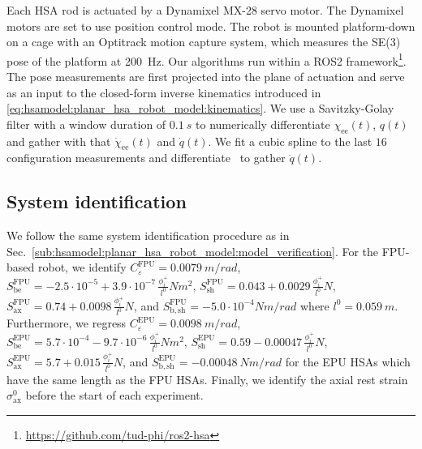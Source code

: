 Each \gls{HSA} rod is actuated by a Dynamixel MX-28 servo motor. The Dynamixel motors are set to use position control mode. %
The robot is mounted platform-down on a cage with an Optitrack motion capture system, which measures the SE(3) pose of the platform at \SI{200}{Hz}.
Our algorithms run within a ROS2 framework\footnote{\url{https://github.com/tud-phi/ros2-hsa}}. %
The pose measurements are first projected into the plane of actuation and serve as an input to the closed-form inverse kinematics introduced in \eqref{eq:hsamodel:planar_hsa_robot_model:kinematics}. 
We use a Savitzky-Golay filter with a window duration of $\SI{0.1}{s}$ to numerically differentiate $\chi_\mathrm{ee}(t)$, $q(t)$ and gather with that $\dot{\chi}_\mathrm{ee}(t)$ and $\dot{q}(t)$.
We fit a cubic spline to the last $16$ configuration measurements and differentiate~\citep{kaptanoglu2022pysindy} to gather $\dot{q}(t)$.


\subsection{System identification}
We follow the same system identification procedure as in Sec.~\ref{sub:hsamodel:planar_hsa_robot_model:model_verification}.
For the FPU-based robot, we identify $C_\varepsilon^\mathrm{FPU}=\SI{0.0079}{m \per rad}$, $S_\mathrm{be}^\mathrm{FPU} = -2.5 \cdot 10^{-5} + 3.9 \cdot 10^{-7} \, \frac{\phi_i^+}{l^0} \si{Nm^2}$, $S_\mathrm{sh}^\mathrm{FPU} = 0.043 + 0.0029 \, \frac{\phi_i^+}{l^0} \si{N}$, $S_\mathrm{ax}^\mathrm{FPU} = 0.74 + 0.0098 \, \frac{\phi_i^+}{l^0} \si{N}$, and $S_\mathrm{b,sh}^\mathrm{FPU} = -5.0 \cdot 10^{-4} \si{Nm \per rad}$ where $l^0 = \SI{0.059}{m}$. 
Furthermore, we regress $C_\varepsilon^\mathrm{EPU}=\SI{0.0098}{m \per rad}$, $S_\mathrm{be}^\mathrm{EPU} = 5.7 \cdot 10^{-4} -9.7 \cdot 10^{-6} \, \frac{\phi_i^+}{l^0} \si{Nm^2}$, $S_\mathrm{sh}^\mathrm{EPU} = 0.59 - 0.00047 \, \frac{\phi_i^+}{l^0} \si{N}$, $S_\mathrm{ax}^\mathrm{EPU} = 5.7 + 0.015 \, \frac{\phi_i^+}{l^0} \si{N}$, and $S_\mathrm{b,sh}^\mathrm{EPU} = -\SI{0.00048}{Nm \per rad}$ for the EPU \glspl{HSA} which have the same length as the FPU \glspl{HSA}.
Finally, we identify the axial rest strain $\sigma_\mathrm{ax}^0$ before the start of each experiment.

